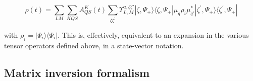 \begin{equation}
\rho(t) =\sum_{LM}\sum_{KQS}A^{K}_{QS}(t)\sum_{\zeta\zeta^{\prime}}\varUpsilon_{L,M}^{u,\zeta\zeta'}|\zeta,\Psi_+\rangle\langle\zeta,\Psi_+|\mu_q\rho_i\mu_{q\prime}^{*}|\zeta^{\prime},\Psi_+\rangle\langle\zeta^{\prime},\Psi_+|
\end{equation}


with $\rho_i = |\Psi_i\rangle\langle\Psi_i|$. This is, effectively, equivalent to an expansion in the various tensor operators defined above, in a state-vector notation.




\subsection{Matrix inversion formalism\label{app:mat-inversion}}






